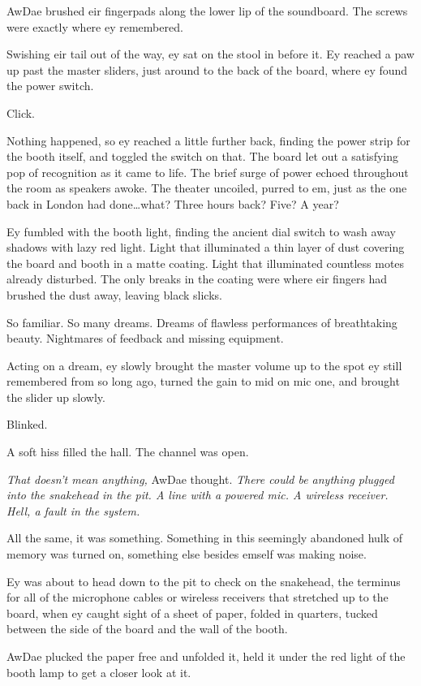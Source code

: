 AwDae brushed eir fingerpads along the lower lip of the soundboard. The screws were exactly where ey remembered.

Swishing eir tail out of the way, ey sat on the stool in before it. Ey reached a paw up past the master sliders, just around to the back of the board, where ey found the power switch.

Click.

Nothing happened, so ey reached a little further back, finding the power strip for the booth itself, and toggled the switch on that. The board let out a satisfying pop of recognition as it came to life. The brief surge of power echoed throughout the room as speakers awoke. The theater uncoiled, purred to em, just as the one back in London had done\ldots{}what? Three hours back? Five? A year?

Ey fumbled with the booth light, finding the ancient dial switch to wash away shadows with lazy red light. Light that illuminated a thin layer of dust covering the board and booth in a matte coating. Light that illuminated countless motes already disturbed. The only breaks in the coating were where eir fingers had brushed the dust away, leaving black slicks.

So familiar. So many dreams. Dreams of flawless performances of breathtaking beauty. Nightmares of feedback and missing equipment.

Acting on a dream, ey slowly brought the master volume up to the spot ey still remembered from so long ago, turned the gain to mid on mic one, and brought the slider up slowly.

Blinked.

A soft hiss filled the hall. The channel was open.

\emph{That doesn't mean anything,} AwDae thought. \emph{There could be anything plugged into the snakehead in the pit. A line with a powered mic. A wireless receiver. Hell, a fault in the system.}

All the same, it was something. Something in this seemingly abandoned hulk of memory was turned on, something else besides emself was making noise.

Ey was about to head down to the pit to check on the snakehead, the terminus for all of the microphone cables or wireless receivers that stretched up to the board, when ey caught sight of a sheet of paper, folded in quarters, tucked between the side of the board and the wall of the booth.

AwDae plucked the paper free and unfolded it, held it under the red light of the booth lamp to get a closer look at it.

